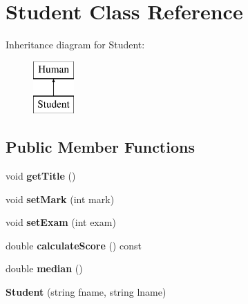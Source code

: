 \hypertarget{class_student}{}\section{Student Class Reference}
\label{class_student}
Inheritance diagram for Student\+:\begin{figure}[H]
\begin{center}
\leavevmode
\includegraphics[height=2.000000cm]{class_student}
\end{center}
\end{figure}
\subsection*{Public Member Functions}
\begin{DoxyCompactItemize}
\item 
\mbox{\label{class_student_ac2c849e92bdc9ee978249414d8a1da74}} 
void {\bfseries get\+Title} ()
\item 
\mbox{\label{class_student_a14d635b4382a2831f865a7d945356da5}} 
void {\bfseries set\+Mark} (int mark)
\item 
\mbox{\label{class_student_a4ca92755dbd4575a66e6266408a62414}} 
void {\bfseries set\+Exam} (int exam)
\item 
\mbox{\label{class_student_ada3f4ec07d50a7f355a0f74eac86823b}} 
double {\bfseries calculate\+Score} () const
\item 
\mbox{\label{class_student_a111aa26fdbf95deb164c02d09546eafc}} 
double {\bfseries median} ()
\item 
\mbox{\label{class_student_a3d2f60e93e849dbe715accb526b1afeb}} 
{\bfseries Student} (string fname, string lname)
\end{DoxyCompactItemize}
